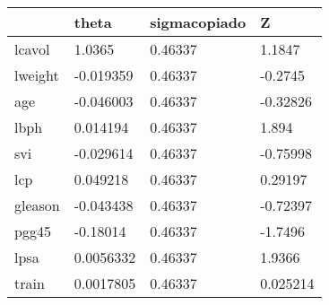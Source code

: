 \begin{tabular}{llll}
& theta & sigmacopiado & Z \\ 
\hline 
lcavol & 1.0365 & 0.46337 & 1.1847 \\ 
lweight & -0.019359 & 0.46337 & -0.2745 \\ 
age & -0.046003 & 0.46337 & -0.32826 \\ 
lbph & 0.014194 & 0.46337 & 1.894 \\ 
svi & -0.029614 & 0.46337 & -0.75998 \\ 
lcp & 0.049218 & 0.46337 & 0.29197 \\ 
gleason & -0.043438 & 0.46337 & -0.72397 \\ 
pgg45 & -0.18014 & 0.46337 & -1.7496 \\ 
lpsa & 0.0056332 & 0.46337 & 1.9366 \\ 
train & 0.0017805 & 0.46337 & 0.025214 \\ 
\hline 
\end{tabular}